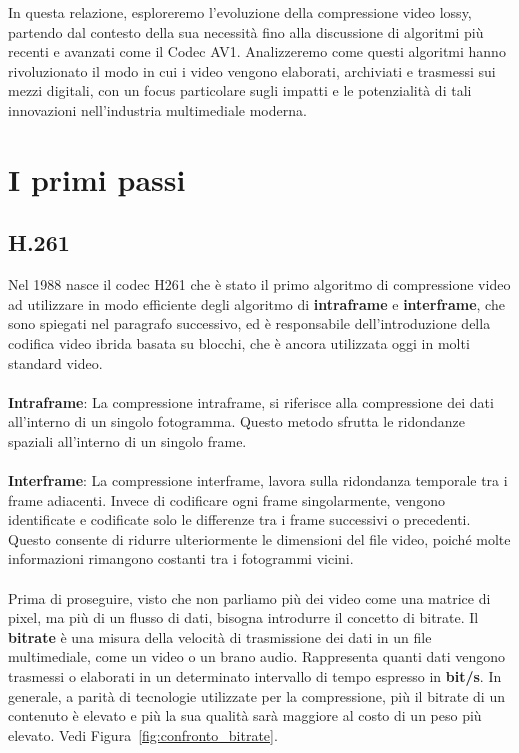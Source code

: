 \documentclass[a4paper,12pt, oneside]{article}
\begin{document}
In questa relazione, esploreremo l'evoluzione della compressione video lossy, partendo dal
contesto della sua necessità fino alla discussione di algoritmi più recenti e avanzati come il
Codec AV1. Analizzeremo come questi algoritmi hanno rivoluzionato il modo in cui i video
vengono elaborati, archiviati e trasmessi sui mezzi digitali, con un focus particolare sugli
impatti e le potenzialità di tali innovazioni nell'industria multimediale moderna.

\section{I primi passi}
\subsection{H.261}
Nel 1988 nasce il codec H261 che è stato il primo algoritmo di compressione video ad utilizzare
in modo efficiente degli algoritmo di \textbf{intraframe} e \textbf{interframe}, che sono
spiegati nel paragrafo successivo, ed è responsabile dell'introduzione della codifica video
ibrida basata su blocchi, che è ancora utilizzata oggi in molti standard video.
\noindent
\\\\\textbf{Intraframe}: La compressione intraframe, si riferisce alla
compressione dei dati all'interno di un singolo fotogramma. Questo metodo sfrutta le ridondanze
spaziali all'interno di un singolo frame.
\\\\\textbf{Interframe}: La compressione interframe, lavora sulla
ridondanza temporale tra i frame adiacenti. Invece di codificare ogni frame singolarmente,
vengono identificate e codificate solo le differenze tra i frame successivi o precedenti.
Questo consente di ridurre ulteriormente le dimensioni del file video, poiché molte
informazioni rimangono costanti tra i fotogrammi vicini.
\noindent
\\\\Prima di proseguire, visto che non parliamo più dei video come una matrice di pixel, ma più di
un flusso di dati, bisogna introdurre il concetto di bitrate.
Il \textbf{bitrate} è una misura della velocità di trasmissione dei dati in un file multimediale,
come un video o un brano audio. Rappresenta quanti dati vengono trasmessi o elaborati in un
determinato intervallo di tempo espresso in \textbf{bit/s}. In generale, a parità di tecnologie
utilizzate per la compressione, più il bitrate di un contenuto è elevato e più la sua qualità
sarà maggiore al costo di un peso più elevato. Vedi Figura~\ref{fig:confronto_bitrate}.
\end{document}
